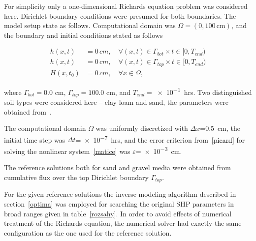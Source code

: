 \documentclass[review,times,3p,twocolumn,10pt]{elsarticle}
\newenvironment{lineq}
    {\begin{linenomath*}
    \begin{equation}
    }
    { 
    \end{equation} 
    \end{linenomath*}
    }
\begin{document}
 For simplicity only a one-dimensional Richards equation problem was considered here.  Dirichlet boundary conditions were presumed for both boundaries. The model setup state as follows. Computational domain was $\Omega=(0,100\,\mathrm{cm})$, and the boundary and initial conditions stated as follows
 \begin{lineq}
 \begin{split}
 h(x,t) &= 0\, cm, \quad \forall (x,t) \in \Gamma_{bot} \times  t \in [0, T_{end}) \\ 
  h(x,t) &= 0\, cm, \quad \forall (x,t) \in \Gamma_{top} \times  t \in [0, T_{end}) \\ 
  H(x,t_0) &= 0\, cm , \quad \forall x \in \Omega,
  \end{split}
\end{lineq}
 where $\Gamma_{bot}=0.0$ cm, $\Gamma_{top}=100.0$ cm, and $T_{end}=$\num{e-1}~hrs. Two distinguished soil types were considered here -- clay loam and sand, the parameters were obtained from~\citep{retc}.
 

 
  The computational domain $\Omega$ was uniformly discretized with $\Delta x$=0.5~cm, the initial time step was $\Delta t$=\num{e-7}~hrs, and the error criterion from~\eqref{picard} for solving the nonlinear system~\eqref{matice} was   $\varepsilon$=\num{e-3}~cm.
 
 The reference solutions both for sand and gravel media were obtained from  cumulative flux over the top Dirichlet boundary $\Gamma_{top}$.
 
For the given reference solutions the inverse modeling algorithm described in section~\ref{optima} was employed for searching the original SHP parameters in broad ranges given in table~\ref{rozsahy}. 
In order to avoid effects of numerical treatment of the Richards equation, the numerical solver had exactly the same configuration as the one used for the reference solution. 
 
\end{document}
